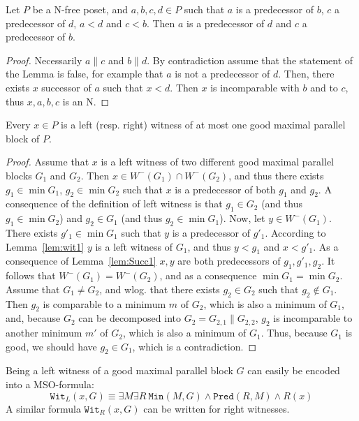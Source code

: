 \documentclass{CSML}
\begin{document}
\begin{lem}
  \label{lem:Succ1}
  Let $P$ be a N-free poset, and $a,b,c,d\in P$ such that $a$ is a predecessor of $b$, $c$ a predecessor of $d$, $a<d$ and $c<b$.
  Then $a$ is a predecessor of $d$ and $c$ a predecessor of $b$.
\end{lem}

\begin{proof}
  Necessarily $a\parallel c$ and $b\parallel d$.
  By contradiction assume that the statement of the Lemma is false, for example that $a$ is not a predecessor of $d$. Then, there exists $x$ successor of $a$ such that $x<d$.
  Then $x$ is incomparable with $b$ and to $c$, thus $x,a,b,c$ is an N.
\end{proof}

\begin{lem}
  \label{lem:wit2}
  Every $x\in P$ is a left (resp. right) witness of at most one good maximal parallel block of $P$.
\end{lem}

\begin{proof}
  Assume that $x$ is a left witness of two different good maximal parallel blocks $G_1$ and $G_2$.
  Then $x\in W^-(G_1)\cap W^-(G_2)$, and thus there exists $g_1\in\min G_1$, $g_2\in\min G_2$ such that $x$ is a predecessor of both $g_1$ and $g_2$.
  A consequence of the definition of left witness is that $g_1\in G_2$ (and thus $g_1\in\min G_2$) and $g_2\in G_1$ (and thus $g_2\in\min G_1$).
  Now, let $y\in W^-(G_1)$. There exists $g'_1\in \min G_1$ such that $y$ is a predecessor of $g'_1$. According to Lemma~\ref{lem:wit1} $y$ is a left witness of $G_1$, and thus $y<g_1$ and $x<g'_1$. As a consequence of Lemma~\ref{lem:Succ1} $x,y$ are both predecessors of $g_1,g'_1,g_2$. It follows that $W^-(G_1)=W^-(G_2)$, and as a consequence $\min G_1=\min G_2$. 
  Assume that $G_1\not= G_2$, and wlog. that there exists $g_2\in G_2$ such that $g_2\not\in G_1$.
  Then $g_2$ is comparable to a minimum $m$ of $G_2$, which is also a minimum of $G_1$, and, because $G_2$ can be decomposed into $G_2=G_{2,1}\parallel G_{2,2}$, $g_2$ is incomparable to another minimum $m'$ of $G_2$, which is also a minimum of $G_1$. Thus, because $G_1$ is good, we should have $g_2\in G_1$, which is a contradiction.
\end{proof}

Being a left witness of a good maximal parallel block $G$ can easily be encoded into a MSO-formula:
$$
  \texttt{Wit}_L(x,G)\equiv 
  \exists M\exists R\ \texttt{Min}(M,G)\land\texttt{Pred}(R,M)\land R(x) 
$$
A similar formula $\texttt{Wit}_R(x,G)$ can be written for right witnesses.
\end{document}
